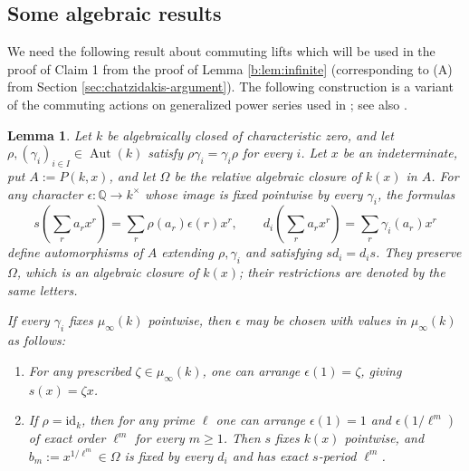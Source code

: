\documentclass[11pt,a4paper]{amsart}
\renewcommand{\ge}{\geqslant}
\newtheorem{lemma}[theorem]{Lemma}
\theoremstyle{definition}
\newcommand{\Q}{\mathbb Q}
\DeclareMathOperator{\Aut}{Aut}
\begin{document}
\subsection{Some algebraic results}


We need the following result about commuting lifts which will be used in the proof of Claim 1 from the proof of Lemma \ref{b:lem:infinite} (corresponding to (A) from Section
\ref{sec:chatzidakis-argument}). The following construction is a variant of the commuting
actions on generalized power series used in
\cite[Theorem~7]{BHAlgClosure}; see also
\cite[Section~2.1]{BCGeometric}.
\begin{lemma}\label{a:lem:hahn}
Let $k$ be algebraically closed of characteristic zero,
and let $\rho,(\gamma_i)_{i\in I}\in\Aut(k)$ satisfy
$\rho\gamma_i=\gamma_i\rho$ for every $i$.
Let $x$ be an indeterminate, put $A:=P(k,x)$, and let
$\Omega$ be the relative algebraic closure of $k(x)$ in $A$.
For any character $\epsilon:\Q\to k^\times$ whose image
is fixed pointwise by every $\gamma_i$, the formulas
\[
s\!\left(\sum_r a_rx^r\right)
   =\sum_r\rho(a_r)\epsilon(r)x^r,
\qquad
d_i\!\left(\sum_r a_rx^r\right)
   =\sum_r\gamma_i(a_r)x^r
\]
define automorphisms of $A$ extending $\rho,\gamma_i$
and satisfying $sd_i=d_is$.
They preserve $\Omega$, which is an algebraic closure
of $k(x)$; their restrictions are denoted by the same letters.

If every $\gamma_i$ fixes $\mu_\infty(k)$ pointwise,
then $\epsilon$ may be chosen with values in $\mu_\infty(k)$
as follows:
\begin{enumerate}[label=\textup{(\roman*)}]
\item For any prescribed $\zeta\in\mu_\infty(k)$,
one can arrange $\epsilon(1)=\zeta$, giving $s(x)=\zeta x$.
\item If $\rho=\mathrm{id}_k$, then for any prime $\ell$
one can arrange $\epsilon(1)=1$ and
$\epsilon(1/\ell^m)$ of exact order $\ell^m$ for every $m\ge1$.
Then $s$ fixes $k(x)$ pointwise, and
$b_m:=x^{1/\ell^m}\in\Omega$ is fixed by every $d_i$
and has exact $s$-period $\ell^m$.
\end{enumerate}
\end{lemma}
\end{document}
